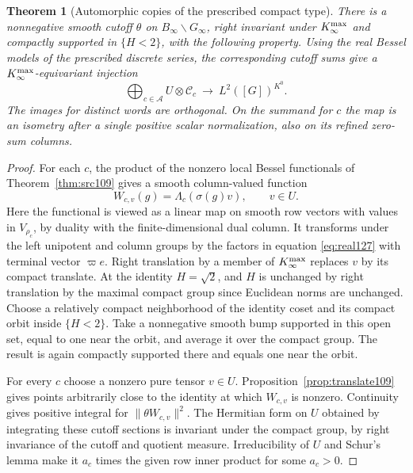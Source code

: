 \documentclass[a4paper,11pt]{article}
\newtheorem{theorem}[proposition]{Theorem}
\theoremstyle{definition}
\theoremstyle{remark}
\numberwithin{equation}{section}
\begin{document}
\begin{theorem}[Automorphic copies of the prescribed compact type]
\label{thm:copies137}
There is a nonnegative smooth cutoff \(\theta\) on
\(B_\infty\backslash G_\infty\), right invariant under
\(K_\infty^{\rm max}\) and compactly supported in \(\{H<2\}\),
with the following property. Using the real Bessel models of
the prescribed discrete series, the corresponding cutoff sums
give a \(K_\infty^{\rm max}\)-equivariant injection
\[
    \bigoplus_{c\in\mathcal A} U\otimes\mathcal C_c
                  \ \longrightarrow\ L^2([G])^{K^0}.
\]
The images for distinct words are orthogonal. On the summand for
\(c\) the map is an isometry after a single positive scalar
normalization, also on its refined zero-sum columns.
\end{theorem}
\begin{proof}
For each \(c\), the product of the nonzero local Bessel
functionals of Theorem~\ref{thm:src109} gives a smooth
column-valued function
\[
     W_{c,v}(g)=\Lambda_c(\sigma(g)v),\qquad  v\in U.
\]
Here the functional is viewed as a linear map on smooth row
vectors with values in \(V_{\rho_c}\), by duality with the
finite-dimensional dual column. It transforms under the left
unipotent and column groups by the factors in equation \ref{eq:real127}
with terminal vector \(\varpi e\). Right translation by a member
of \(K_\infty^{\rm max}\) replaces \(v\) by its compact translate.
At the identity \(H=\sqrt2\), and \(H\) is unchanged by right
translation by the maximal compact group since Euclidean norms
are unchanged. Choose a relatively compact neighborhood of the
identity coset and its compact orbit inside \(\{H<2\}\). Take a
nonnegative smooth bump supported in this open set, equal to one
near the orbit, and average it over the compact group. The result
is again compactly supported there and equals one near the orbit.

For every \(c\) choose a nonzero pure tensor \(v\in U\).
Proposition~\ref{prop:translate109} gives points arbitrarily
close to the identity at which \(W_{c,v}\) is nonzero.
Continuity gives positive integral for \(\|\theta W_{c,v}\|^2\).
The Hermitian form on \(U\) obtained by integrating these
cutoff sections is invariant under the compact group, by right
invariance of the cutoff and quotient measure. Irreducibility
of \(U\) and Schur's lemma make it \(a_c\) times the given row
inner product for some \(a_c>0\).


\end{proof}
\end{document}
